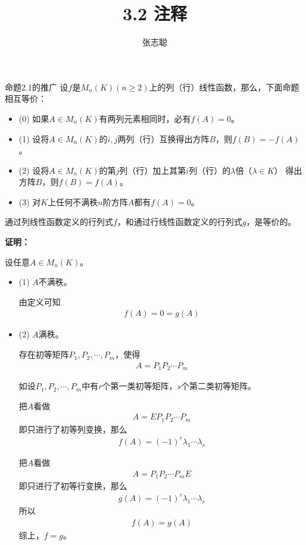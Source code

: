 \documentclass{article}
\begin{document}
\title{3.2 注释}
\author{张志聪}
\maketitle

\begin{zremark}
  命题2.1的推广 设$f$是$M_n(K) (n \geq 2)$上的列（行）线性函数，那么，下面命题相互等价：
  \begin{itemize}
    \item (0) 如果$A \in M_n(K)$有两列元素相同时，必有$f(A) = 0$。
    \item (1) 设将$A \in M_n(K)$的$i,j$两列（行）互换得出方阵$B$，则$f(B) = - f(A)$。
    \item (2) 设将$A \in M_n(K)$的第$j$列（行）加上其第$i$列（行）的$\lambda$倍（$\lambda \in K$）
          得出方阵$B$，则$f(B) = f(A)$。
    \item (3) 对$K$上任何不满秩$n$阶方阵$A$都有$f(A) = 0$。
  \end{itemize}
\end{zremark}

\begin{zremark}
  通过列线性函数定义的行列式$f$，和通过行线性函数定义的行列式$g$，是等价的。
\end{zremark}

\textbf{证明：}

设任意$A \in M_n(K)$。
\begin{itemize}
  \item (1) $A$不满秩。

        由定义可知
        \begin{align*}
          f(A) = 0 = g(A)
        \end{align*}

  \item (2) $A$满秩。

        存在初等矩阵$P_1, P_2, \cdots, P_m$，使得
        \begin{align*}
          A = P_1 P_2 \cdots P_m
        \end{align*}

        如设$P_1, P_2, \cdots, P_m$中有$r$个第一类初等矩阵，$s$个第二类初等矩阵。

        把$A$看做
        \begin{align*}
          A = E P_1 P_2 \cdots P_m
        \end{align*}
        即只进行了初等列变换，那么
        \begin{align*}
          f(A) = (-1)^{r} \lambda_1 \cdots \lambda_s
        \end{align*}

        把$A$看做
        \begin{align*}
          A = P_1 P_2 \cdots P_m E
        \end{align*}
        即只进行了初等行变换，那么
        \begin{align*}
          g(A) = (-1)^{r} \lambda_1 \cdots \lambda_s
        \end{align*}
        所以
        \begin{align*}
          f(A) = g(A)
        \end{align*}
        综上，$f = g$。
\end{itemize}
\end{document}
